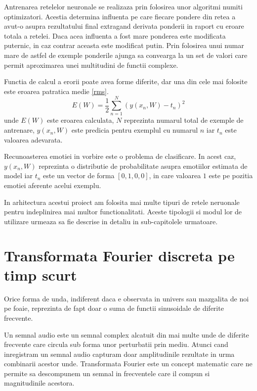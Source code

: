 \documentclass[a4paper,12pt]{book}
\begin{document}
			Antrenarea retelelor neuronale se realizaza prin folosirea unor algoritmi numiti optimizatori. Acestia determina influenta pe care fiecare pondere din retea a avut-o asupra rezultatului final extragand derivata ponderii in raport cu eroare totala a retelei. Daca acea influenta a fost mare ponderea este modificata puternic, in caz contrar aceasta este modificat putin. Prin folosirea unui numar mare de astfel de exemple ponderile ajunga sa convearga la un set de valori care permit aproximarea unei multitudini de functii complexe. \par
			
			Functia de calcul a erorii poate avea forme diferite, dar una din cele mai folosite este eroarea patratica medie \ref{rms}.
			\begin{equation} \label{rms}
				E(W) = \frac{1}{2} \sum_{n=1}^{N} (y(x_n, W) - t_n)^2
			\end{equation}
			unde $E(W)$ este eroarea calculata, $N$ reprezinta numarul total de exemple de antrenare, $y(x_n, W)$ este predicia pentru exemplul cu numarul $n$ iar $t_n$ este valoarea adevarata. \par
			
			Recunoasterea emotiei in vorbire este o problema de clasificare. In acest caz, $y(x_n, W)$ reprezinta o distributie de probabilitate asupra emotiilor estimata de model iar $t_n$ este un vector de forma $[0,1,0,0]$, in care valoarea $1$ este pe pozitia emotiei aferente acelui exemplu. \par
			
			In arhitectura acestui proiect am folosita mai multe tipuri de retele neruonale pentru indeplinirea mai multor functionalitati. Aceste tipologii si modul lor de utilizare urmeaza sa fie descrise in detaliu in sub-capitolele urmatoare.
			\section{Transformata Fourier discreta pe timp scurt} 
			
			Orice forma de unda, indiferent daca e observata in univers sau mazgalita de noi pe foaie, reprezinta de fapt doar o suma de functii sinusoidale de diferite frecvente.\par
			
			Un semnal audio este un semnal complex alcatuit din mai multe unde de diferite frecvente care circula sub forma unor perturbatii prin mediu. Atunci cand inregistram un semnal audio capturam doar amplitudinile rezultate in urma combinarii acestor unde. Transformata Fourier este un concept matematic care ne permite sa descompunem un semnal in frecventele care il compun si magnitudinile acestora.\par 
			
\end{document}
